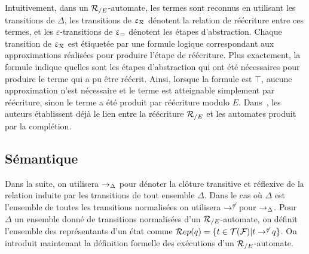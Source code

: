 Intuitivement, dans un ${\mathcal R_{/E}}$-automate, les termes sont reconnus en utilisant les transitions de $\Delta$, les transitions de $\upvarepsilon_{\mathcal R}$ dénotent la relation de réécriture
entre ces termes, et les $\varepsilon$-transitions de $\upvarepsilon_{=}$ dénotent
les étapes d'abstraction. Chaque transition de $\upvarepsilon_{\mathcal R}$ est étiquetée par une formule logique
correspondant aux approximations réalisées pour produire l'étape de réécriture. 
Plus exactement, la formule indique quelles sont les étapes d'abstraction qui ont été nécessaires 
pour produire le terme qui a pu être réécrit. 
Ainsi, lorsque la formule est $\top$, aucune approximation n'est nécessaire et le terme
est atteignable simplement par réécriture, sinon le terme a été produit par réécriture 
modulo $E$. Dans~\cite{GenetR-JSC10}, les auteurs établissent déjà le lien entre la réécriture ${\mathcal R_{/E}}$
et les automates produit par la complétion.




\subsection{Sémantique}







Dans la suite, on utilisera $\rightarrow_\Delta$ pour dénoter la clôture transitive et réflexive de 
la relation induite par les transitions de tout ensemble $\Delta$. 
Dans le cas où $\Delta$ est l'ensemble de toutes les transitions normalisées on utilisera $\rightarrow^{\not\varepsilon}$ 
pour $\rightarrow_\Delta$. 
Pour $\Delta$ un ensemble donné de transitions normalisées d'un ${\mathcal R_{/E}}$-automate, 
on définit l'ensemble des représentants d'un état comme $\mathcal R ep(q) = \{ t \in \mathcal{T(F)} | t \rightarrow^{\not\varepsilon} q\}$. 
On introduit maintenant la définition formelle des exécutions d'un ${\mathcal R_{/E}}$-automate.

